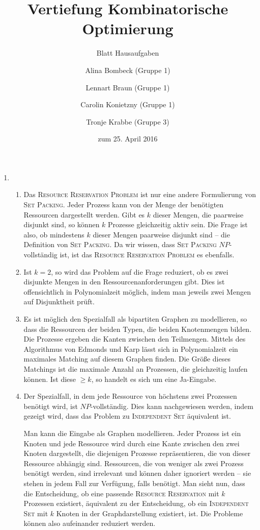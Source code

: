 \documentclass[a4paper]{scrartcl}
\title{Vertiefung Kombinatorische Optimierung}
\subtitle{Blatt {\blattnr} Hausaufgaben}
\author{%
    Alina Bombeck (Gruppe 1) \and
    Lennart Braun (Gruppe 1) \and
    Carolin Konietzny (Gruppe 1) \and
    Tronje Krabbe (Gruppe 3)
}
\date{zum 25. April 2016}
\begin{document}
\maketitle


\begin{enumerate}[label=\bfseries \arabic*.]
\item %
\begin{enumerate}
    \item
        Das \textsc{Resource Reservation Problem} ist nur eine andere
        Formulierung von \textsc{Set Packing}.  Jeder Prozess kann von der
        Menge der benötigten Ressourcen dargestellt werden.  Gibt es $k$ dieser
        Mengen, die paarweise disjunkt sind, so können $k$ Prozesse
        gleichzeitig aktiv sein.  Die Frage ist also, ob mindestens $k$ dieser
        Mengen paarweise disjunkt sind -- die Definition von \textsc{Set
        Packing}.  Da wir wissen, dass \textsc{Set Packing} $NP$-vollständig
        ist, ist das \textsc{Resource Reservation Problem} es ebenfalls.

    \item %
        Ist $k = 2$, so wird das Problem auf die Frage reduziert, ob es zwei
        disjunkte Mengen in den Ressourcenanforderungen gibt.
        Dies ist offensichtlich in Polynomialzeit möglich, indem man jeweils
        zwei Mengen auf Disjunktheit prüft.

    \item %
        Es ist möglich den Spezialfall als bipartiten Graphen zu modellieren,
        so dass die Ressourcen der beiden Typen, die beiden Knotenmengen bilden.
        Die Prozesse ergeben die Kanten zwischen den Teilmengen.
        Mittels des Algorithmus von Edmonds und Karp lässt sich in
        Polynomialzeit ein maximales Matching auf diesem Graphen finden.
        Die Größe dieses Matchings ist die maximale Anzahl an Prozessen, die
        gleichzeitig laufen können. Ist diese $\geq k$, so handelt es sich um
        eine Ja-Eingabe.

    \item %
        Der Spezialfall, in dem jede Ressource von höchstens zwei Prozessen
        benötigt wird, ist $NP$-vollständig.
        Dies kann nachgewiesen werden, indem gezeigt wird, dass das Problem zu
        \textsc{Independent Set} äquivalent ist.

        Man kann die Eingabe als Graphen modellieren.
        Jeder Prozess ist ein Knoten und jede Ressource wird durch eine Kante
        zwischen den zwei Knoten dargestellt, die diejenigen Prozesse
        repräsentieren, die von dieser Ressource abhängig sind.
        Ressourcen, die von weniger als zwei Prozess benötigt werden, sind
        irrelevant und können daher ignoriert werden -- sie stehen in jedem
        Fall zur Verfügung, falls benötigt.
        Man sieht nun, dass die Entscheidung, ob eine passende \textsc{Resource
        Reservation} mit $k$ Prozessen existiert, äquivalent zu der
        Entscheidung, ob ein \textsc{Independent Set} mit $k$ Knoten in der
        Graphdarstellung existiert, ist.
        Die Probleme können also aufeinander reduziert werden.


\end{enumerate}
\end{enumerate}
\end{document}

